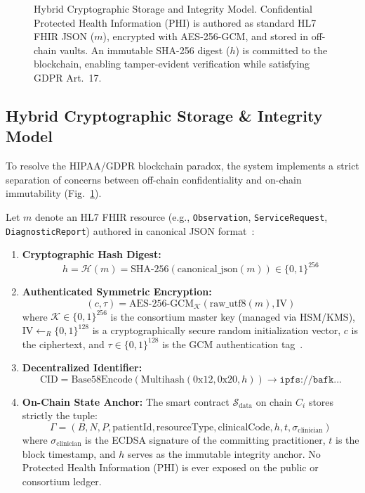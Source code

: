 \documentclass[conference]{IEEEtran}
\theoremstyle{definition}
\begin{document}
\begin{figure}[t]
\centering

\caption{Hybrid Cryptographic Storage and Integrity Model. Confidential Protected Health Information (PHI) is authored as standard HL7 FHIR JSON ($m$), encrypted with AES-256-GCM, and stored in off-chain vaults. An immutable SHA-256 digest ($h$) is committed to the blockchain, enabling tamper-evident verification while satisfying GDPR Art.~17.}
\label{fig:crypto}
\end{figure}

\subsection{Hybrid Cryptographic Storage \& Integrity Model}
To resolve the HIPAA/GDPR blockchain paradox, the system implements a strict separation of concerns between off-chain confidentiality and on-chain immutability (Fig.~\ref{fig:crypto}).

Let $m$ denote an HL7 FHIR resource (e.g., \texttt{Observation}, \texttt{ServiceRequest}, \texttt{DiagnosticReport}) authored in canonical JSON format~\cite{hl7fhir, zhang2018fhirchain}:
\begin{enumerate}
    \item \textbf{Cryptographic Hash Digest:}
    \begin{equation}
    h = \mathcal{H}(m) = \text{SHA-256}(\text{canonical\_json}(m)) \in \{0, 1\}^{256}
    \end{equation}
    \item \textbf{Authenticated Symmetric Encryption:}
    \begin{equation}
    (c, \tau) = \text{AES-256-GCM}_{\mathcal{K}}(\text{raw\_utf8}(m), \text{IV})
    \end{equation}
    where $\mathcal{K} \in \{0,1\}^{256}$ is the consortium master key (managed via HSM/KMS), $\text{IV} \leftarrow_R \{0,1\}^{128}$ is a cryptographically secure random initialization vector, $c$ is the ciphertext, and $\tau \in \{0,1\}^{128}$ is the GCM authentication tag~\cite{dworkin2007recommendation}.
    \item \textbf{Decentralized Identifier:}
    \begin{equation}
    \text{CID} = \text{Base58Encode}(\text{Multihash}(0\text{x}12, 0\text{x}20, h)) \rightarrow \texttt{ipfs://bafk...}
    \end{equation}
    \item \textbf{On-Chain State Anchor:}
    The smart contract $\mathcal{S}_{\text{data}}$ on chain $C_i$ stores strictly the tuple:
    \begin{equation}
    \Gamma = (B, N, P, \text{patientId}, \text{resourceType}, \text{clinicalCode}, h, t, \sigma_{\text{clinician}})
    \end{equation}
    where $\sigma_{\text{clinician}}$ is the ECDSA signature of the committing practitioner, $t$ is the block timestamp, and $h$ serves as the immutable integrity anchor. No Protected Health Information (PHI) is ever exposed on the public or consortium ledger.
\end{enumerate}
\end{document}
